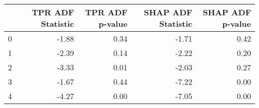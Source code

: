 \begin{tabular}{lrrrr}
\toprule
 & TPR ADF Statistic & TPR ADF p-value & SHAP ADF Statistic & SHAP ADF p-value \\
\midrule
0 & -1.88 & 0.34 & -1.71 & 0.42 \\
1 & -2.39 & 0.14 & -2.22 & 0.20 \\
2 & -3.33 & 0.01 & -2.03 & 0.27 \\
3 & -1.67 & 0.44 & -7.22 & 0.00 \\
4 & -4.27 & 0.00 & -7.05 & 0.00 \\
\bottomrule
\end{tabular}
